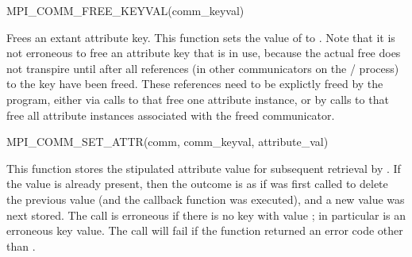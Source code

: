 \begin{funcdef}{MPI\_COMM\_FREE\_KEYVAL}{(\mbox{comm\_keyval})}
\end{funcdef}

Frees an extant attribute key.
This function sets the value of  to
.
Note that it is not erroneous to free an attribute key
that is in use, because the actual free does not transpire until after all
references (in other communicators on the \MPI/ process) to the key have been freed.
These references need to be explictly freed by the program, either via calls
to  that free one attribute instance, or by calls
to  that free all attribute instances associated with
the freed communicator.

%
\begin{funcdef}{MPI\_COMM\_SET\_ATTR}{(\mbox{comm}, \mbox{comm\_keyval}, \mbox{attribute\_val})}
\end{funcdef}

This function stores the stipulated attribute value 
for subsequent retrieval by .
If the value is already present, then the outcome
is as if  %
was first called to delete the previous
value (and the callback function  was executed), and a new
value was next stored. The call is erroneous if there is no key with value
; in particular
 is an erroneous key value.
The call will fail if the  function returned an error code
other than .

